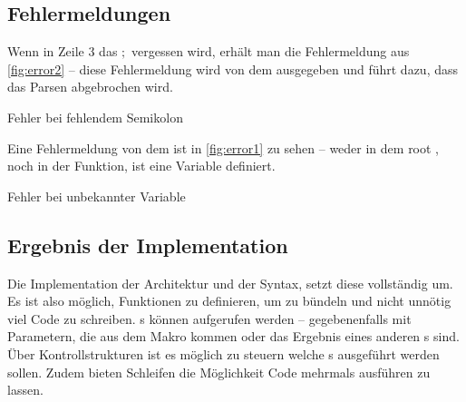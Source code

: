   \subsection{Fehlermeldungen}
  \label{ssec:Fehlermeldungen}
    Wenn in Zeile 3 das \myRIn$;$ vergessen wird, erhält man die Fehlermeldung aus \autoref{fig:error2} -- diese Fehlermeldung wird von dem  ausgegeben und führt dazu, dass das Parsen abgebrochen wird.

    \begin{myCodeEnv}
      \centering
      \begin{myInvBox}[width=.9\linewidth]
        
      \end{myInvBox}
      \caption{Fehler bei fehlendem Semikolon}
      \label{fig:error2}
    \end{myCodeEnv}

    Eine Fehlermeldung von dem  ist in \autoref{fig:error1} zu sehen -- weder in dem root , noch in der  Funktion, ist eine Variable  definiert.
    \begin{myCodeEnv}
      \centering
      \begin{myInvBox}[width=.9\linewidth]
        
      \end{myInvBox}
      \caption{Fehler bei unbekannter Variable}
      \label{fig:error1}
    \end{myCodeEnv}

  \subsection{Ergebnis der Implementation}
  \label{ssec:Ergebnis der Implementation}
    Die Implementation der Architektur und der Syntax, setzt diese vollständig um. Es ist also möglich, Funktionen zu definieren, um  zu bündeln und nicht unnötig viel Code zu schreiben. s können aufgerufen werden -- gegebenenfalls mit Parametern, die aus dem Makro kommen oder das Ergebnis eines anderen s sind. Über Kontrollstrukturen ist es möglich zu steuern welche s ausgeführt werden sollen. Zudem bieten Schleifen die Möglichkeit Code mehrmals ausführen zu lassen.

